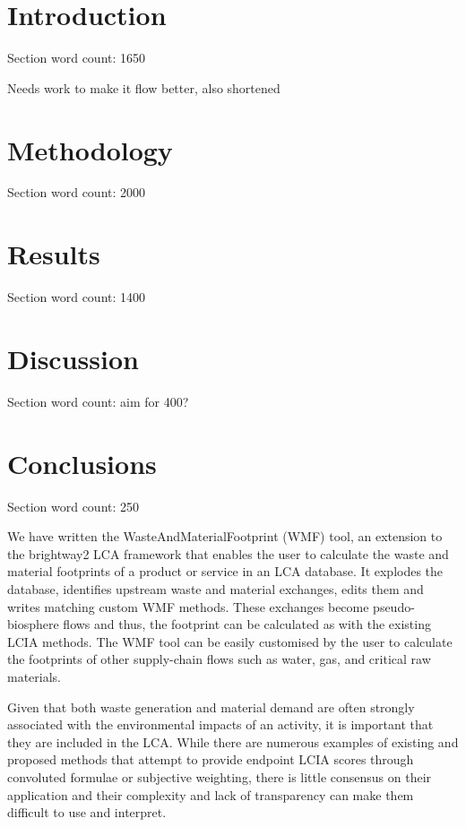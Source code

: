 \documentclass[review,3p,authoryear]{elsarticle}
\newcommand{\cbox}[1]{
    \begin{tcolorbox}[hbox, colback=red!5!white, colframe=red!65!black, boxrule=0.25pt, boxsep=2pt, left=2pt, right=2pt, top=1pt, bottom=1pt]
        \small\sffamily #1
    \end{tcolorbox}
}
\begin{document}
\section{Introduction}
\label{sec:introduction}
\cbox{Section word count: 1650}
\cbox{Needs work to make it flow better, also shortened}


\section{Methodology}
\label{sec:methodology}
\cbox{Section word count: 2000}


\section{Results}
\cbox{Section word count: 1400}
\label{sec:results}


\section{Discussion}
\label{sec:discussion}

\cbox{Section word count: aim for 400?}

\section{Conclusions}
\label{sec:conclusions}
\cbox{Section word count: 250}
We have written the WasteAndMaterialFootprint (WMF) tool, an extension to the brightway2 LCA framework that enables the user to calculate the waste and material footprints of a product or service in an LCA database. It explodes the database, identifies upstream waste and material exchanges, edits them and writes matching custom WMF methods. These exchanges become pseudo-biosphere flows and thus, the footprint can be calculated as with the existing LCIA methods. The WMF tool can be easily customised by the user to calculate the footprints of other supply-chain flows such as water, gas, and critical raw materials.

Given that both waste generation and material demand are often strongly associated with the environmental impacts of an activity, it is important that they are included in the LCA. While there are numerous examples of existing and proposed methods that attempt to provide endpoint LCIA scores through convoluted formulae or subjective weighting, there is little consensus on their application and their complexity and lack of transparency can make them difficult to use and interpret.
\end{document}
